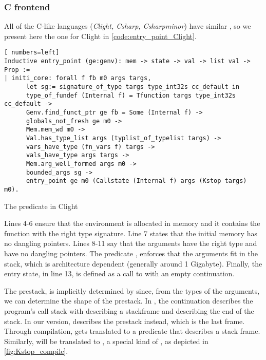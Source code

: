 \subsubsection{C frontend}
All of the C-like languages (\emph{Clight, Csharp, Csharpminor}) have similar , so we present here the one for Clight in \autoref{code:entry_point_Clight}.
\begin{table}
\begin{lstlisting}[ numbers=left]
Inductive entry_point (ge:genv): mem -> state -> val -> list val -> Prop :=
| initi_core: forall f fb m0 args targs,
      let sg:= signature_of_type targs type_int32s cc_default in
      type_of_fundef (Internal f) = Tfunction targs type_int32s cc_default ->
      Genv.find_funct_ptr ge fb = Some (Internal f) ->
      globals_not_fresh ge m0 ->
      Mem.mem_wd m0 ->
      Val.has_type_list args (typlist_of_typelist targs) ->
      vars_have_type (fn_vars f) targs ->
      vals_have_type args targs ->
      Mem.arg_well_formed args m0 ->
      bounded_args sg ->
      entry_point ge m0 (Callstate (Internal f) args (Kstop targs) m0).
\end{lstlisting}
\caption{The  predicate in Clight}\label{code:entry_point_Clight}
\end{table}
Lines 4-6 ensure that the environment is allocated in memory and it contains the function  with the right type signature. Line 7 states that the initial memory has no dangling pointers. Lines 8-11 say that the arguments have the right type and have no dangling pointers. The predicate , enforces that the arguments fit in the stack, which is architecture dependent (generally around 1 Gigabyte). Finally, the entry state, in line 13, is defined as a call to  with an empty continuation.

The prestack, is implicitly determined by  since, from the types of the arguments, we can determine the shape of the prestack. In , the continuation describes the program's call stack with  describing a stackframe and  describing the end of the stack. In our version,  describes the prestack instead, which is the last frame. Through compilation,  gets translated to a predicate  that describes a stack frame. Similarly,  will be translated to , a special kind of , as depicted in \ref{fig:Kstop_compile}.

